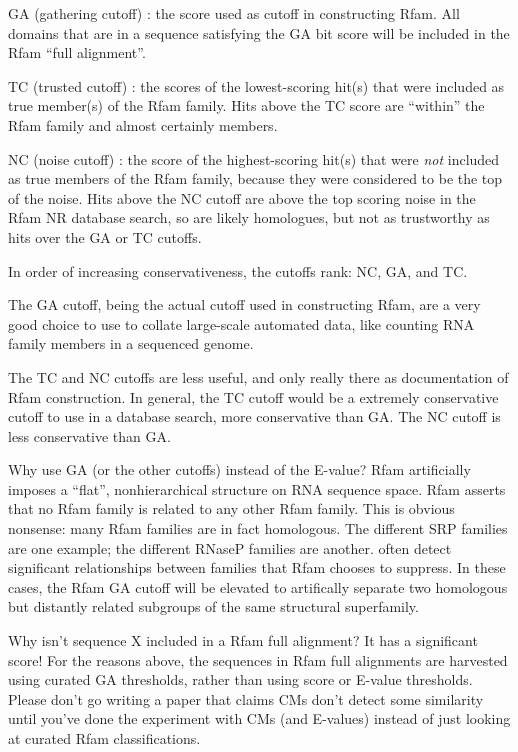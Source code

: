 \begin{wideitem}
\item[GA (gathering cutoff)]: the score used as cutoff in
constructing Rfam. All domains that are in a sequence satisfying the
GA bit score will be included in the Rfam ``full alignment''.

\item[TC (trusted cutoff)]: the scores of the lowest-scoring hit(s)
that were included as true member(s) of the Rfam family. Hits above
the TC score are ``within'' the Rfam family and almost certainly
members.

\item[NC (noise cutoff)]: the score of the highest-scoring hit(s) that
were \textit{not} included as true members of the Rfam family, because
they were considered to be the top of the noise.  Hits above the NC
cutoff are above the top scoring noise in the Rfam NR database search,
so are likely homologues, but not as trustworthy as hits over the GA
or TC cutoffs.
\end{wideitem}

In order of increasing conservativeness, the cutoffs rank: NC, GA, and
TC.

The GA cutoff, being the actual cutoff used in constructing Rfam,
are a very good choice to use to collate large-scale automated data,
like counting RNA family members in a sequenced genome.

The TC and NC cutoffs are less useful, and only really there as
documentation of Rfam construction. In general, the TC cutoff would
be a extremely conservative cutoff to use in a database search, more
conservative than GA. The NC cutoff is less conservative than GA.

Why use GA (or the other cutoffs) instead of the E-value? Rfam
artificially imposes a ``flat'', nonhierarchical structure on RNA
sequence space.  Rfam asserts that no Rfam family is related to any
other Rfam family. This is obvious nonsense: many Rfam families are in
fact homologous.  The different SRP families are one example; the
different RNaseP families are another.  often
detect significant relationships between families that Rfam chooses to
suppress. In these cases, the Rfam GA cutoff will be elevated to
artifically separate two homologous but distantly related subgroups of
the same structural superfamily.

\begin{srefaq}{Why isn't sequence X included in a Rfam full alignment?
It has a significant score!} For the reasons above, the sequences in
Rfam full alignments are harvested using curated GA thresholds, rather
than using score or E-value thresholds. Please don't go writing a
paper that claims CMs don't detect some similarity until you've done
the experiment with CMs (and E-values) instead of just looking at
curated Rfam classifications.
\end{srefaq}

